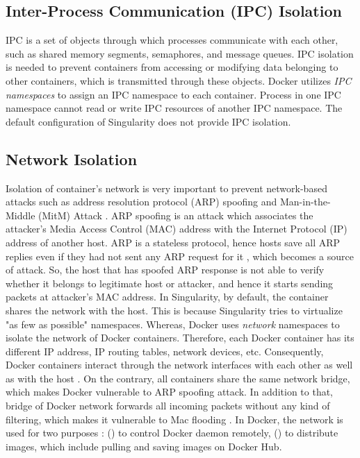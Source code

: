 \subsection{Inter-Process Communication (IPC) Isolation}

IPC is a set of objects through which processes communicate with
each other, such as shared memory segments, semaphores, and message queues.
IPC isolation is needed to prevent containers
from accessing or modifying data belonging to other containers, which is
transmitted through these objects. Docker utilizes \textit{IPC namespaces}
to assign an IPC namespace to each container. Process in one IPC namespace
cannot read or write IPC resources of another IPC namespace.
The default configuration of Singularity does not provide IPC isolation.

\subsection{Network Isolation}


Isolation of container's network is very important to prevent
network-based attacks such as address resolution protocol (ARP)
spoofing and Man-in-the-Middle (MitM) Attack \cite{lockhart2004network}.
ARP spoofing is an attack which associates the attacker's Media Access
Control (MAC) address with the Internet Protocol (IP) address of another host.
ARP is a stateless protocol, hence hosts save all ARP replies even if they had not
sent any ARP request for it \cite{ramachandran2005detecting}, which becomes a
source of attack. So, the host that has spoofed ARP response is not able to
verify whether it belongs to legitimate host or attacker, and hence it starts
sending packets at attacker's MAC address.
In Singularity, by default, the container shares the network with the host.
This is because Singularity tries to virtualize "as few as possible" namespaces.
Whereas, Docker uses \textit{network} namespaces
\cite{NetworkNamespace} to isolate the network of Docker containers.
Therefore, each Docker container has its different IP address,
IP routing tables, network devices, etc. Consequently, Docker containers
interact through the network interfaces with each other as well as with
the host \cite{dockerNetworkdoc}. On the contrary, all containers share
the same network bridge, which makes Docker vulnerable to ARP spoofing attack.
In addition to that, bridge of Docker network forwards all incoming packets
without any kind of filtering, which makes it vulnerable to Mac flooding
\cite{bui2015analysis}.
In Docker, the network is used for two purposes : () to control
Docker daemon remotely, () to distribute images, which
include pulling and saving images on Docker Hub.

